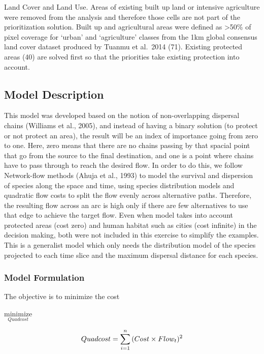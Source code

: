 \documentclass[]{article}
\begin{document}
Land Cover and Land Use. Areas of existing built up land or intensive agriculture were removed from the analysis and therefore those cells are not part of the prioritization solution. Built up and agricultural areas were defined as \textgreater{}50\% of pixel coverage for `urban' and `agriculture' classes from the 1km global consensus land cover dataset produced by Tuanmu et al.~2014 (71). Existing protected areas (40) are solved first so that the priorities take existing protection into account.

\hypertarget{model-description}{%
\subsection{Model Description}\label{model-description}}

This model was developed based on the notion of non-overlapping dispersal chains (Williams et al., 2005), and instead of having a binary solution (to protect or not protect an area), the result will be an index of importance going from zero to one. Here, zero means that there are no chains passing by that spacial point that go from the source to the final destination, and one is a point where chains have to pass through to reach the desired flow.
In order to do this, we follow Network-flow methods (Ahuja et al., 1993) to model the survival and dispersion of species along the space and time, using species distribution models and quadratic flow costs to split the flow evenly across alternative paths. Therefore, the resulting flow across an arc is high only if there are few alternatives to use that edge to achieve the target flow.
Even when model takes into account protected areas (cost zero) and human habitat such as cities (cost infinite) in the decision making, both were not included in this exercise to simplify the examples. This is a generalist model which only needs the distribution model of the species projected to each time slice and the maximum dispersal distance for each species.

\hypertarget{model-formulation}{%
\subsubsection{Model Formulation}\label{model-formulation}}

The objective is to minimize the cost

\(\underset{Quadcost}{\text{minimize}}\)

\[\small Quadcost =  \sum_{i=1}^n{(Cost\times Flow_t)^2}\]
\end{document}
